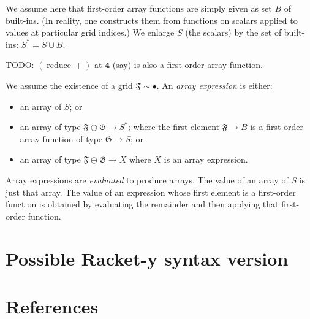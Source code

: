\documentclass[11pt]{article}
\newcommand{\gr}[1]{\mathfrak{#1}}
\newcommand{\unit}{\bullet}
\DeclareMathOperator{\reduce}{reduce}
\begin{document}
We assume here that first-order array functions are simply given as set \(B\) of
built-ins.  (In reality, one constructs them from functions on scalars applied
to values at particular grid indices.) We enlarge \(S\) (the scalars) by the set
of built-ins: \(S^* = S\cup B\).

TODO: \((\reduce +)\) at \(\mathbf{4}\) (say) is also a first-order array function.  

We assume the existence of a grid \(\gr{F}\sim\unit\). An \emph{array expression} is
either:
\begin{itemize}
\item an array of \(S\); or
\item an array of type \(\gr{F}\oplus\gr{G}\to S^*\); where the first element
\(\gr{F}\to B\) is a first-order array function of type \(\gr{G}\to S\); or
\item an array of type \(\gr{F}\oplus\gr{G}\to X\) where \(X\) is an array expression.
\end{itemize}

Array expressions are \emph{evaluated} to produce arrays. The value of an array of
\(S\) is just that array. The value of an expression whose first element is a
first-order function is obtained by evaluating the remainder and then applying
that first-order function.

\section{Possible Racket-y syntax version}
\label{sec:orga1852e4}


\section{References}
\label{sec:orgbf56ab8}

\label{org334ac2d}


\label{orgefbceba}

\end{document}
